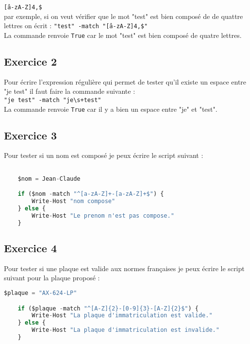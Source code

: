 \documentclass[12pt, a4paper]{article}
\begin{document}
\texttt{\^[a-zA-Z]{4,}\$}\\

par exemple, si on veut vérifier que le mot "test" est bien composé de de quattre lettres on écrit : 
\texttt{"test" -match "\^[a-zA-Z]{4,}\$"}\\

La commande renvoie \texttt{True} car le mot "test" est bien composé de quatre lettres.\\


\subsection{Exercice 2}
Pour écrire l’expression régulière qui permet de tester qu’il existe un espace entre "je test"
il faut faire la commande suivante :\\

\texttt{"je test" -match "je\textbackslash s+test"}\\

La commande renvoie \texttt{True} car il y a bien un espace entre "je" et "test".\\

\newpage
\subsection{Exercice 3}
Pour tester si un nom est composé je peux écrire le script suivant :\\

\begin{lstlisting}[language=Python]

    $nom = Jean-Claude

    if ($nom -match "^[a-zA-Z]+-[a-zA-Z]+$") {
        Write-Host "nom compose"
    } else {
        Write-Host "Le prenom n'est pas compose."
    }

\end{lstlisting}


\subsection{Exercice 4}
Pour tester si une plaque est valide aux normes françaises je peux écrire le script
suivant pour la plaque proposé :\\

\begin{lstlisting}[language=Python]
    $plaque = "AX-624-LP"

    if ($plaque -match "^[A-Z]{2}-[0-9]{3}-[A-Z]{2}$") {
        Write-Host "La plaque d'immatriculation est valide."
    } else {
        Write-Host "La plaque d'immatriculation est invalide."
    }
\end{lstlisting}
\end{document}
